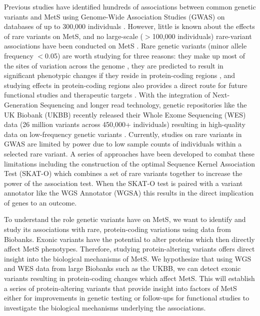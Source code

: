 \documentclass[11pt]{article}
\begin{document}
Previous studies have identified hundreds of associations between common genetic variants and MetS using Genome-Wide Association Studies (GWAS) on databases of up to 300,000 individuals \cite{pmid31589552}. However, little is known about the effects of rare variants on MetS, and no large-scale ($>$100,000 individuals) rare-variant associations have been conducted on MetS \cite{Lee2018}. Rare genetic variants (minor allele frequency $<$0.05) are worth studying for three reasons: they make up most of the sites of variation across the genome \cite{pmid34662886}, they are predicted to result in significant phenotypic changes if they reside in protein-coding regions \cite{pmid34662886}, and studying effects in protein-coding regions also provides a direct route for future functional studies and therapeutic targets \cite{doi:10.1056/NEJMoa2117872}. With the integration of Next-Generation Sequencing and longer read technology, genetic repositories like the UK Biobank (UKBB) recently released their Whole Exome Sequencing  (WES) data (26 million variants across 450,000+ individuals) resulting in high-quality data on low-frequency genetic variants \cite{pmid34662886}. Currently, studies on rare variants in GWAS are limited by power due to low sample counts of individuals within a selected rare variant. A series of approaches have been developed to combat these limitations including the construction of the optimal Sequence Kernel Association Test (SKAT-O) \cite{pmid22863193} which combines a set of rare variants together to increase the power of the association test. When the SKAT-O test is paired with a variant annotator like the WGS Annotator (WGSA) \cite{pmid26395054} this results in the direct implication of genes to an outcome.

To understand the role genetic variants have on MetS, we want to identify and study its associations with rare, protein-coding variations using data from Biobanks. Exonic variants have the potential to alter proteins which then directly affect MetS phenotypes. Therefore, studying protein-altering variants offers direct insight into the biological mechanisms of MetS. We hypothesize that using WGS and WES data from large Biobanks such as the UKBB, we can detect exonic variants resulting in protein-coding changes which affect MetS. This will establish a series of protein-altering variants that provide insight into factors of MetS either for improvements in genetic testing or follow-ups for functional studies to investigate the biological mechanisms underlying the associations.
\end{document}
